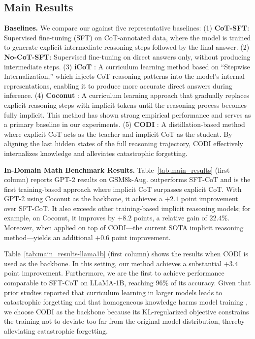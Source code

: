 \subsection{Main Results}
\noindent \textbf{Baselines.}  
We compare our \methodname against five representative baselines:  
(1) \textbf{CoT-SFT}: Supervised fine-tuning (SFT) on CoT-annotated data, where the model is trained to generate explicit intermediate reasoning steps followed by the final answer.  
(2) \textbf{No-CoT-SFT}: Supervised fine-tuning on direct answers only, without producing intermediate steps.  
(3) \textbf{iCoT} \citep{icot}: A curriculum learning method based on ``Stepwise Internalization,'' which injects CoT reasoning patterns into the model’s internal representations, enabling it to produce more accurate direct answers during inference.  
(4) \textbf{Coconut} \citep{hao2024coconut}: A curriculum learning approach that gradually replaces explicit reasoning steps with implicit tokens until the reasoning process becomes fully implicit. This method has shown strong empirical performance and serves as a primary baseline in our experiments.  
(5) \textbf{CODI} \citep{shen2025codi}: A distillation-based method where explicit CoT acts as the teacher and implicit CoT as the student. By aligning the last hidden states of the full reasoning trajectory, CODI effectively internalizes knowledge and alleviates catastrophic forgetting.

\noindent \textbf{In-Domain Math Benchmark Results.}  
Table~\ref{tab:main_results} (first column) reports GPT-2 results on GSM8k-Aug. \methodname outperforms SFT-CoT and is the first training-based approach where implicit CoT surpasses explicit CoT. With GPT-2 using Coconut as the backbone, it achieves a $+2.1$ point improvement over SFT-CoT. It also exceeds other training-based implicit reasoning models; for example, on Coconut, it improves by $+8.2$ points, a relative gain of $22.4\%$. Moreover, when applied on top of CODI---the current SOTA implicit reasoning method---\methodname yields an additional $+0.6$ point improvement.


Table~\ref{tab:main_results-llama1b} (first column) shows the results when CODI is used as the backbone. In this setting, our method achieves a substantial $+3.4$ point improvement. Furthermore, we are the first to achieve performance comparable to SFT-CoT on LLaMA-1B, reaching $96\%$ of its accuracy. Given that prior studies \citep{xu2025softcot, shen2025codi} reported that curriculum learning in larger models leads to catastrophic forgetting and that homogeneous knowledge harms model training \citep{LLMSurvey}, we choose CODI as the backbone because its KL-regularized objective constrains the training not to deviate too far from the original model distribution, thereby alleviating catastrophic forgetting.

